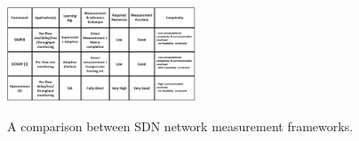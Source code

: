 \begin{table}
\centering
	{\includegraphics[keepaspectratio, width=0.42\textwidth]{CompTable_New2.png}} 
  \caption{{A comparison between SDN network measurement frameworks.}}
  \label{tab:SDNFrmCmp}
\end{table}




